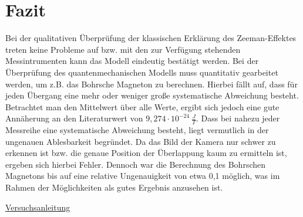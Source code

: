 \documentclass[bigchapter,colorback,accentcolor=tud4b,linedtoc,11pt]{tudreport}
\begin{document}
\chapter{Fazit}

Bei der qualitativen Überprüfung der klassischen Erklärung des Zeeman-Effektes treten keine Probleme auf bzw. mit den zur Verfügung stehenden Messintrumenten kann das Modell eindeutig bestätigt werden. Bei der Überprüfung des quantenmechanischen Modells muss quantitativ gearbeitet werden, um z.B. das Bohrsche Magneton zu berechnen. Hierbei fällt auf, dass für jeden Übergang eine mehr oder weniger große systematische Abweichung besteht. Betrachtet man den Mittelwert über alle Werte, ergibt sich jedoch eine gute Annäherung an den Literaturwert von $9,274 \cdot 10^{-24}~ \frac{J}{T}$. Dass bei nahezu jeder Messreihe eine systematische Abweichung besteht, liegt vermutlich in der ungenauen Ablesbarkeit begründet. Da das Bild der Kamera nur schwer zu erkennen ist bzw. die genaue Position der Überlappung kaum zu ermitteln ist, ergeben sich hierbei Fehler. Dennoch war die Berechnung des Bohrschen Magnetons bis auf eine relative Ungenauigkeit von etwa 0,1 möglich, was im Rahmen der Möglichkeiten als gutes Ergebnis anzusehen ist.

\cleardoublepage{}
\newpage
\begin{thebibliography}{100}
   \url{Versuchsanleitung}
\end{thebibliography}
\end{document}
